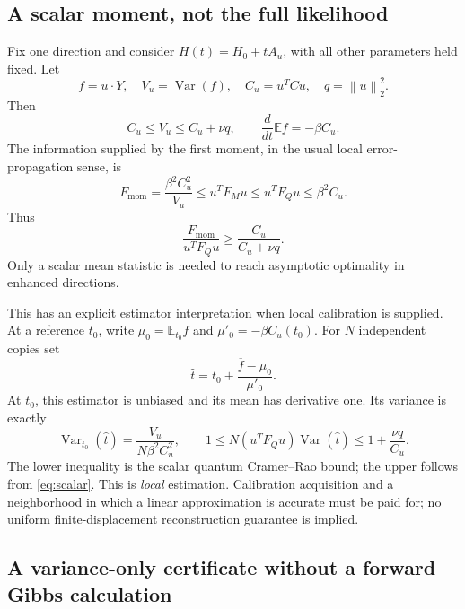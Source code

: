 \documentclass[11pt,a4paper]{article}
\theoremstyle{remark}
\newcommand{\Var}{\operatorname{Var}}
\newcommand{\E}{\mathbb E}
\newcommand{\norm}[1]{\left\lVert #1\right\rVert}
\begin{document}
\subsection{A scalar moment, not the full likelihood}
Fix one direction and consider $H(t)=H_0+tA_u$, with all other parameters held fixed. Let
\[
 f=u\cdot Y,\quad V_u=\Var(f),\quad C_u=u^TCu,\quad q=\norm{u}_2^2.
\]
Then
\begin{equation}
 C_u\le V_u\le C_u+\nu q,
 \qquad \frac{d}{dt}\E f=-\beta C_u.
 \label{eq:scalar}
\end{equation}
The information supplied by the first moment, in the usual local error-propagation sense, is
\begin{equation}
 F_{\mathrm{mom}}=\frac{\beta^2C_u^2}{V_u}
 \le u^TF_Mu\le u^TF_Qu\le\beta^2C_u.
 \label{eq:Fmom}
\end{equation}
Thus
\begin{equation}
 \frac{F_{\mathrm{mom}}}{u^TF_Qu}\ge
 \frac{C_u}{C_u+\nu q}.
 \label{eq:momratio}
\end{equation}
Only a scalar mean statistic is needed to reach asymptotic optimality in enhanced directions.

This has an explicit estimator interpretation when local calibration is supplied. At a reference $t_0$, write $\mu_0=\E_{t_0}f$ and $\mu'_0=-\beta C_u(t_0)$. For $N$ independent copies set
\begin{equation}
 \widehat t=t_0+\frac{\overline f-\mu_0}{\mu'_0}.
 \label{eq:estimator}
\end{equation}
At $t_0$, this estimator is unbiased and its mean has derivative one. Its variance is exactly
\begin{equation}
 \Var_{t_0}(\widehat t)=\frac{V_u}{N\beta^2C_u^2},\qquad
 1\le N(u^TF_Qu)\Var(\widehat t)\le1+\frac{\nu q}{C_u}.
 \label{eq:estvar}
\end{equation}
The lower inequality is the scalar quantum Cramer--Rao bound; the upper follows from \eqref{eq:scalar}. This is \emph{local} estimation. Calibration acquisition and a neighborhood in which a linear approximation is accurate must be paid for; no uniform finite-displacement reconstruction guarantee is implied.

\subsection{A variance-only certificate without a forward Gibbs calculation}
\end{document}
